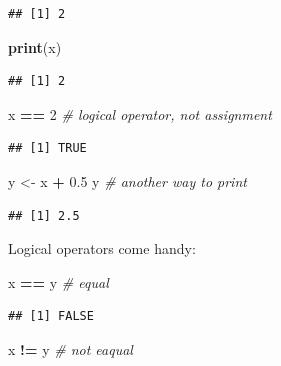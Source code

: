 \documentclass[12pt,]{book}
\newenvironment{Shaded}{\begin{snugshade}}{\end{snugshade}}
\newcommand{\CommentTok}[1]{\textcolor[rgb]{0.56,0.35,0.01}{\textit{#1}}}
\newcommand{\DecValTok}[1]{\textcolor[rgb]{0.00,0.00,0.81}{#1}}
\newcommand{\FloatTok}[1]{\textcolor[rgb]{0.00,0.00,0.81}{#1}}
\newcommand{\KeywordTok}[1]{\textcolor[rgb]{0.13,0.29,0.53}{\textbf{#1}}}
\newcommand{\NormalTok}[1]{#1}
\newcommand{\OperatorTok}[1]{\textcolor[rgb]{0.81,0.36,0.00}{\textbf{#1}}}
\newcommand{\StringTok}[1]{\textcolor[rgb]{0.31,0.60,0.02}{#1}}
\begin{document}
\begin{verbatim}
## [1] 2
\end{verbatim}

\begin{Shaded}
\begin{Highlighting}[]
\KeywordTok{print}\NormalTok{(x)}
\end{Highlighting}
\end{Shaded}

\begin{verbatim}
## [1] 2
\end{verbatim}

\begin{Shaded}
\begin{Highlighting}[]
\NormalTok{x }\OperatorTok{==}\StringTok{ }\DecValTok{2} \CommentTok{# logical operator, not assignment}
\end{Highlighting}
\end{Shaded}

\begin{verbatim}
## [1] TRUE
\end{verbatim}

\begin{Shaded}
\begin{Highlighting}[]
\NormalTok{y <-}\StringTok{ }\NormalTok{x }\OperatorTok{+}\StringTok{ }\FloatTok{0.5}
\NormalTok{y }\CommentTok{# another way to print}
\end{Highlighting}
\end{Shaded}

\begin{verbatim}
## [1] 2.5
\end{verbatim}

Logical operators come handy:

\begin{Shaded}
\begin{Highlighting}[]
\NormalTok{x }\OperatorTok{==}\StringTok{ }\NormalTok{y }\CommentTok{# equal}
\end{Highlighting}
\end{Shaded}

\begin{verbatim}
## [1] FALSE
\end{verbatim}

\begin{Shaded}
\begin{Highlighting}[]
\NormalTok{x }\OperatorTok{!=}\StringTok{ }\NormalTok{y }\CommentTok{# not eaqual}
\end{Highlighting}
\end{Shaded}
\end{document}
